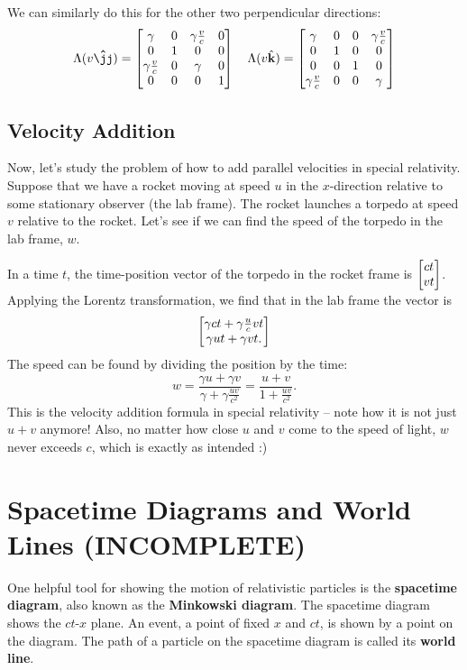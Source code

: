 \documentclass[12pt]{scrartcl}
\begin{document}
We can similarly do this for the other two perpendicular directions:
\[ \Lambda(v \jhatt) =
	\bmat{
		\gamma             & 0 & \gamma \frac{v}{c} & 0 \\
		0                  & 1 & 0                  & 0 \\
		\gamma \frac{v}{c} & 0 & \gamma             & 0 \\
		0                  & 0 & 0                  & 1
	}
	\quad
	\Lambda(v\hat{\bf k}) =
	\bmat{
		\gamma             & 0 & 0 & \gamma\frac{v}{c} \\
		0                  & 1 & 0 & 0                 \\
		0                  & 0 & 1 & 0                 \\
		\gamma \frac{v}{c} & 0 & 0 & \gamma
	}
\]

\subsection*{Velocity Addition}
Now, let's study the problem of how to add parallel velocities in special relativity. Suppose that we have a rocket moving at speed $u$ in the $x$-direction relative to some stationary observer (the lab frame). The rocket launches a torpedo at speed $v$ relative to the rocket. Let's see if we can find the speed of the torpedo in the lab frame, $w$.

In a time $t$, the time-position vector of the torpedo in the rocket frame is $\begin{bmatrix}ct \\ vt\end{bmatrix}$. Applying the Lorentz transformation, we find that in the lab frame the vector is
\[
	\begin{bmatrix}
		\gamma c t + \gamma \frac u c v t \\
		\gamma u t + \gamma v t.
	\end{bmatrix}
\]
The speed can be found by dividing the position by the time:
\[
	w = \frac{\gamma u + \gamma v}{\gamma + \gamma \frac{uv}{c^2}} = \frac{u+v}{1+\frac{uv}{c^2}}.
\]
This is the velocity addition formula in special relativity -- note how it is not just $u + v$ anymore! Also, no matter how close $u$ and $v$ come to the speed of light, $w$ never exceeds $c$, which is exactly as intended :)

\section{Spacetime Diagrams and World Lines (INCOMPLETE)}
One helpful tool for showing the motion of relativistic particles is the \textbf{spacetime diagram}, also known as the \textbf{Minkowski diagram}. The spacetime diagram shows the $ct$-$x$ plane. An event, a point of fixed $x$ and $ct$, is shown by a point on the diagram. The path of a particle on the spacetime diagram is called its \textbf{world line}.
\end{document}
